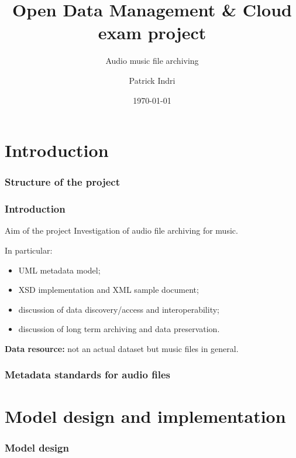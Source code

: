 \documentclass{beamer}
\title{Open Data Management \& Cloud\\exam project}
\subtitle{Audio music file archiving}
\author{Patrick Indri}
\date{\today}
\newcommand\rb[1]{\textcolor{ThemeRed}{\textbf{#1}}}
\begin{document}
	\setcounter{showSlideNumbers}{0}

	\frame{\titlepage}

	\setcounter{framenumber}{0}
	\setcounter{showSlideNumbers}{1}



\section{Introduction}

  \begin{frame}
    \frametitle{Structure of the project}
  \end{frame}



  \begin{frame}
    \frametitle{Introduction}

    \begin{block}{Aim of the project}
      Investigation of audio file archiving for music.
    \end{block}

    \vspace{1em}

    In particular:
    \begin{itemize}
      \item UML metadata model;
      \item XSD implementation and XML sample document;
      \item discussion of data discovery/access and interoperability;
      \item discussion of long term archiving and data preservation.
    \end{itemize}

    \vspace{1em}

    \rb{Data resource:} not an actual dataset but music files in general.

  \end{frame}



  \begin{frame}
    \frametitle{Metadata standards for audio files}
  \end{frame}



\section{Model design and implementation}

  \begin{frame}
    \frametitle{Model design}
  \end{frame}
\end{document}
